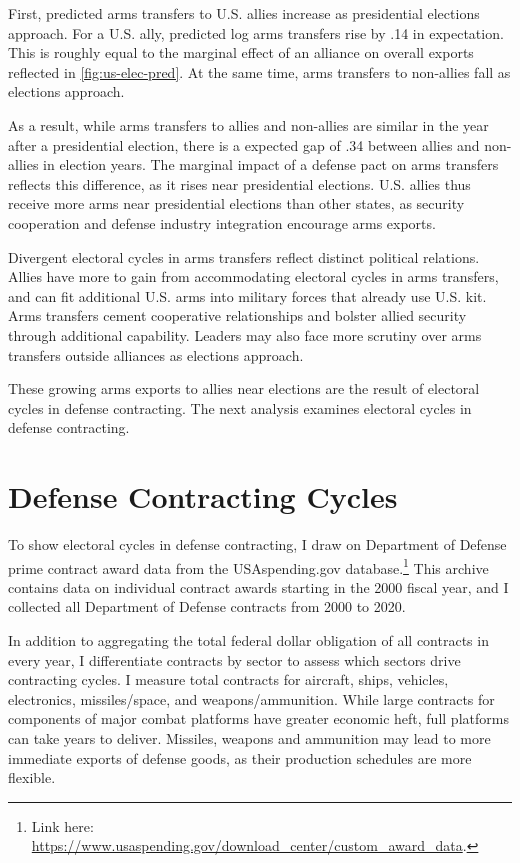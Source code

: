 \documentclass[12pt]{article}
\begin{document}
First, predicted arms transfers to U.S. allies increase as presidential elections approach.
For a U.S. ally, predicted log arms transfers rise by .14 in expectation. 
This is roughly equal to the marginal effect of an alliance on overall exports reflected in \autoref{fig:us-elec-pred}.
At the same time, arms transfers to non-allies fall as elections approach. 


As a result, while arms transfers to allies and non-allies are similar in the year after a presidential election, there is a expected gap of .34 between allies and non-allies in election years.
The marginal impact of a defense pact on arms transfers reflects this difference, as it rises near presidential elections.
U.S. allies thus receive more arms near presidential elections than other states, as security cooperation and defense industry integration encourage arms exports.


Divergent electoral cycles in arms transfers reflect distinct political relations.
Allies have more to gain from accommodating electoral cycles in arms transfers, and can fit additional U.S. arms into military forces that already use U.S. kit.
Arms transfers cement cooperative relationships and bolster allied security through additional capability.
Leaders may also face more scrutiny over arms transfers outside alliances as elections approach. 


These growing arms exports to allies near elections are the result of electoral cycles in defense contracting. 
The next analysis examines electoral cycles in defense contracting. 



\section{Defense Contracting Cycles}


To show electoral cycles in defense contracting, I draw on Department of Defense prime contract award data from the USAspending.gov database.\footnote{Link here: \url{https://www.usaspending.gov/download_center/custom_award_data}.} 
This archive contains data on individual contract awards starting in the 2000 fiscal year, and I collected all Department of Defense contracts from 2000 to 2020.


In addition to aggregating the total federal dollar obligation of all contracts in every year, I differentiate contracts by sector to assess which sectors drive contracting cycles. 
I measure total contracts for aircraft, ships, vehicles, electronics, missiles/space, and weapons/ammunition. 
While large contracts for components of major combat platforms have greater economic heft, full platforms can take years to deliver. 
Missiles, weapons and ammunition may lead to more immediate exports of defense goods, as their production schedules are more flexible.
\end{document}
